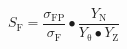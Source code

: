 \begin{equation}
S_{\mathrm{F}}\mathrm{=}\frac{{\sigma }_{\mathrm{FP}}}{{\sigma }_{\mathrm{F}}}\bullet \frac{Y_{\mathrm{N}}}{Y_{\mathrm{\theta }}\bullet Y_{\mathrm{Z}}}
\end{equation}